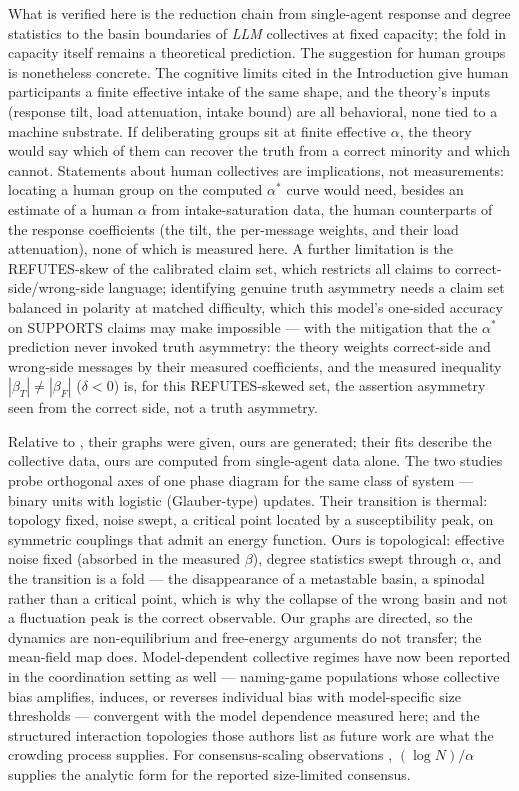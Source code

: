 \documentclass[9pt,twocolumn]{extarticle}
\newcommand{\astar}{\alpha^{*}}
\begin{document}
What is verified here is the reduction chain from single-agent response and
degree statistics to the basin boundaries of \emph{LLM} collectives at fixed
capacity; the fold in capacity itself remains a theoretical prediction.
The suggestion for human groups is nonetheless concrete. The cognitive limits cited in the Introduction give human participants a finite effective intake of the same shape, and the theory's inputs (response tilt, load attenuation, intake bound) are all behavioral, none tied to a machine substrate. If deliberating groups sit at finite effective $\alpha$, the theory would say which of them can recover the truth from a correct minority and which cannot. Statements about human collectives are implications, not measurements:
locating a human group on the computed $\astar$ curve would need, besides an
estimate of a human $\alpha$ from intake-saturation data, the human
counterparts of the response coefficients (the tilt, the per-message weights,
and their load attenuation), none of which is measured here. A further limitation is the
REFUTES-skew of the calibrated claim set, which restricts all claims to
correct-side/wrong-side language; identifying genuine truth asymmetry needs
a claim set balanced in polarity at matched difficulty, which this model's
one-sided accuracy on SUPPORTS claims may make impossible --- with the
mitigation that the $\astar$ prediction never invoked truth asymmetry: the
theory weights correct-side and wrong-side messages by their measured
coefficients, and the measured inequality $|\beta_T| \ne |\beta_F|$
($\delta < 0$) is, for this REFUTES-skewed set, the assertion asymmetry seen
from the correct side, not a truth asymmetry.

Relative to \citet{El2026}, their graphs were given, ours are generated;
their fits describe the collective data, ours are computed from single-agent data alone. The two studies probe
orthogonal axes of one phase diagram for the same class of system --- binary
units with logistic (Glauber-type) updates. Their transition is thermal:
topology fixed, noise swept, a critical point located by a susceptibility
peak, on symmetric couplings that admit an energy function. Ours is
topological: effective noise fixed (absorbed in the measured $\beta$),
degree statistics swept through $\alpha$, and the transition is a fold ---
the disappearance of a metastable basin, a spinodal rather than a critical
point, which is why the collapse of the wrong basin and not a fluctuation peak is the
correct observable. Our graphs are directed, so the dynamics are non-equilibrium and free-energy arguments do not transfer; the mean-field
map does. Model-dependent collective regimes have now been reported in the
coordination setting as well --- naming-game populations whose collective
bias amplifies, induces, or reverses individual bias with model-specific
size thresholds \citep{Flint2026} --- convergent with the model dependence
measured here; and the structured interaction topologies those authors list
as future work are what the crowding process supplies. For
consensus-scaling observations \citep{DeMarzo2024},
$(\log N)/\alpha$ supplies the analytic form for the reported size-limited
consensus.
\end{document}
